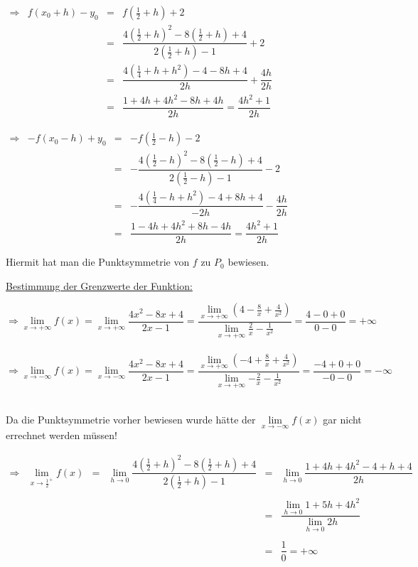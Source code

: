 \documentclass[main.tex]{subfiles}
\begin{document}
$\begin{array}{rccl}
	\Rightarrow & f(x_{0}+h)-y_{0} & = & f(\frac{1}{2} + h) +2 \\
	&&=&\dfrac{4(\frac{1}{2}+h)^2 -8(\frac{1}{2}+h) +4}{2(\frac{1}{2}+h)-1}+2 \\
	&&=&\dfrac{4(\frac{1}{4} +h +h^2)-4 -8h +4}{2h} + \dfrac{4h}{2h} \\
	&&=&\dfrac{1+4h+4h^2-8h+4h}{2h} = \dfrac{4h^2+1}{2h}
\end{array}$

$\begin{array}{rccl}
	\Rightarrow & -f(x_{0}-h)+y_{0} & = & -f(\frac{1}{2} - h) -2 \\
	&&=&-\dfrac{4(\frac{1}{2}-h)^2 -8(\frac{1}{2}-h) +4}{2(\frac{1}{2}-h)-1}-2\\
	&&=&-\dfrac{4(\frac{1}{4} -h +h^2)-4 +8h +4}{-2h} - \dfrac{4h}{2h}    \\
	&&=&\dfrac{1-4h+4h^2+8h-4h}{2h} = \dfrac{4h^2+1}{2h}
\end{array}$

Hiermit hat man die Punktsymmetrie von $f$ zu $P_{0}$ bewiesen.

\underline{Bestimmung der Grenzwerte der Funktion:}

$\Rightarrow \lim\limits_{x \rightarrow +\infty} {f(x)} = \lim\limits_{x \rightarrow +\infty} {\dfrac{4x^2-8x+4}{2x-1}} = \dfrac{\lim\limits_{x \rightarrow +\infty} {(4-\frac{8}{x} + \frac{4}{x^2}) }}{{\lim\limits_{x \rightarrow +\infty}}{ \frac{2}{x} - \frac{1}{x^2} }} = \dfrac{4-0+0}{0-0} = +\infty $\\ \\

$\Rightarrow \lim\limits_{x \rightarrow -\infty} {f(x)} = \lim\limits_{x \rightarrow -\infty} {\dfrac{4x^2-8x+4}{2x-1}} = \dfrac{\lim\limits_{x \rightarrow +\infty} {(-4+\frac{8}{x} + \frac{4}{x^2}) }}{{\lim\limits_{x \rightarrow +\infty}}{ -\frac{2}{x} - \frac{1}{x^2} }} = \dfrac{-4+0+0}{-0-0} = -\infty $\\ \\

\begin{Bemerkung}
Da die Punktsymmetrie vorher bewiesen wurde hätte der $\lim\limits_{x \rightarrow -\infty} {f(x)}$ gar nicht errechnet werden müssen!
\end{Bemerkung}

$\begin{array}{rccccl}
	\Rightarrow &  \lim\limits_{x \rightarrow {\frac{1}{2}}^{+}} {f(x)} & = & \lim\limits_{h \rightarrow 0} {\dfrac{4(\frac{1}{2} +h)^2 -8(\frac{1}{2} +h) +4}{2(\frac{1}{2}+h) -1} } & = & \lim\limits_{h \rightarrow 0} {\dfrac{1+4h+4h^2-4+h+4 }{2h}}\\ \\
	&&&&=&\dfrac{\lim\limits_{h \rightarrow 0} {1+5h+4h^2}}{\lim\limits_{h \rightarrow 0}{2h}} \\ \\
	&&&&=& \dfrac{1}{0} = +\infty \\ \\
\end{array}$
\end{document}
